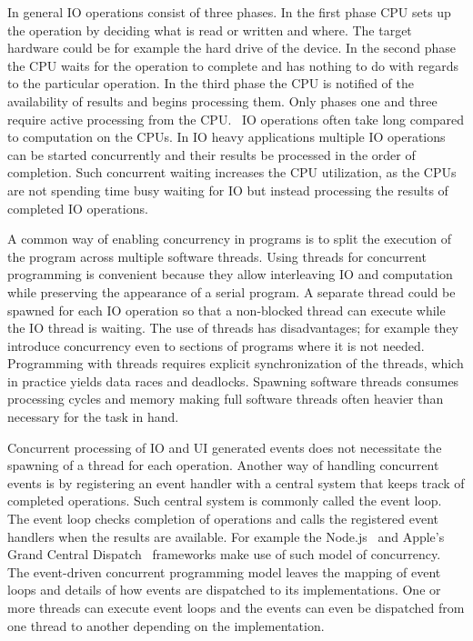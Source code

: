 In general IO operations consist of three phases. In the first phase CPU sets up the operation by deciding what is read or written and where. The target hardware could be for example the hard drive of the device. In the second phase the CPU waits for the operation to complete and has nothing to do with regards to the particular operation. In the third phase the CPU is notified of the availability of results and begins processing them. Only phases one and three require active processing from the CPU.~\cite{friesen2015asynchronous} IO operations often take long compared to computation on the CPUs. In IO heavy applications multiple IO operations can be started concurrently and their results be processed in the order of completion. Such concurrent waiting increases the CPU utilization, as the CPUs are not spending time busy waiting for IO but instead processing the results of completed IO operations.~\cite{dabek2002event}

A common way of enabling concurrency in programs is to split the execution of the program across multiple software threads. Using threads for concurrent programming is convenient because they allow interleaving IO and computation while preserving the appearance of a serial program. A separate thread could be spawned for each IO operation so that a non-blocked thread can execute while the IO thread is waiting. The use of threads has disadvantages; for example they introduce concurrency even to sections of programs where it is not needed. Programming with threads requires explicit synchronization of the threads, which in practice yields data races and deadlocks. Spawning software threads consumes processing cycles and memory making full software threads often heavier than necessary for the task in hand.~\cite{dabek2002event, lee2006problem}

Concurrent processing of IO and UI generated events does not necessitate the spawning of a thread for each operation. Another way of handling concurrent events is by registering an event handler with a central system that keeps track of completed operations. Such central system is commonly called the event loop. The event loop checks completion of operations and calls the registered event handlers when the results are available. For example the Node.js~\cite{tilkov2010node} and Apple's Grand Central Dispatch~\cite{sakamoto2012grand} frameworks make use of such model of concurrency. The event-driven concurrent programming model leaves the mapping of event loops and details of how events are dispatched to its implementations. One or more threads can execute event loops and the events can even be dispatched from one thread to another depending on the implementation.

